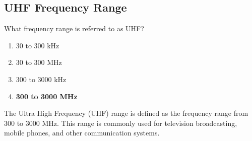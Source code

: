 \subsection{UHF Frequency Range}
\label{T3B09}

\begin{tcolorbox}[colback=gray!10!white,colframe=black!75!black,title=T3B09]
What frequency range is referred to as UHF?
\begin{enumerate}[noitemsep]
    \item 30 to 300 kHz
    \item 30 to 300 MHz
    \item 300 to 3000 kHz
    \item \textbf{300 to 3000 MHz}
\end{enumerate}
\end{tcolorbox}

The Ultra High Frequency (UHF) range is defined as the frequency range from 300 to 3000 MHz. This range is commonly used for television broadcasting, mobile phones, and other communication systems.